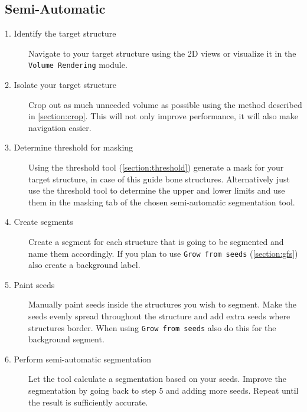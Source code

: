 \pagebreak
\subsection{Semi-Automatic}
\begin{description}
	\item [1. Identify the target structure] Navigate to your target structure using the 2D views or visualize it in the \texttt{Volume Rendering} module.
	\item [2. Isolate your target structure] Crop out as much unneeded volume as possible using the method described in \cref{section:crop}. This will not only improve performance, it will also make navigation easier.
	\item [3. Determine threshold for masking] Using the threshold tool (\cref{section:threshold}) generate a mask for your target structure, in case of this guide bone structures. Alternatively just use the threshold tool to determine the upper and lower limits and use them in the masking tab of the chosen semi-automatic segmentation tool.
	\item [4. Create segments] Create a segment for each structure that is going to be segmented and name them accordingly. If you plan to use \texttt{Grow from seeds} (\cref{section:gfs}) also create a background label.
	\item [5. Paint seeds] Manually paint seeds inside the structures you wish to segment. Make the seeds evenly spread throughout the structure and add extra seeds where structures border. When using \texttt{Grow from seeds} also do this for the background segment.
	\item [6. Perform semi-automatic segmentation] Let the tool calculate a segmentation based on your seeds. Improve the segmentation by going back to step 5 and adding more seeds. Repeat until the result is sufficiently accurate.
\end{description}

\pagebreak
